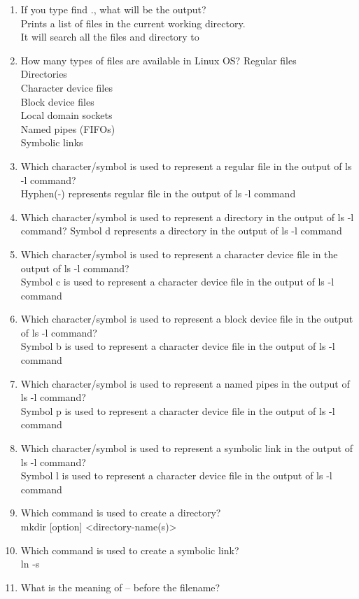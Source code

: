 \documentclass[12pt,a4]{article}
\begin{document}
\begin{enumerate}
\item  If you type find ., what will be the output?\\
Prints a list of files in the current working directory.
\\ It will search all the files and directory to
\item  How many types of files are available in Linux OS?
	Regular files\\
Directories\\
Character device files\\
Block device files\\
Local domain sockets\\
Named pipes (FIFOs)\\
Symbolic links
\item  Which character/symbol is used to represent a regular file in the output of ls -l
command?\\
Hyphen(-) represents regular file in the output of ls -l
command
\item Which character/symbol is used to represent a directory in the output of ls -l command?
Symbol d represents a directory in the output of ls -l command
\item  Which character/symbol is used to represent a character device file in the output of
ls -l command?\\
Symbol c is  used to represent a character device file in the output of
ls -l command
\item  Which character/symbol is used to represent a block device file in the output of
ls -l command?\\
Symbol b is  used to represent a character device file in the output of
ls -l command
\item  Which character/symbol is used to represent a named pipes in the output of ls -l
command?\\
Symbol p is  used to represent a character device file in the output of
ls -l command
\item Which character/symbol is used to represent a symbolic link in the output of ls -l
command?\\
Symbol l is  used to represent a character device file in the output of
ls -l command
\item  Which command is used to create a directory?\\
mkdir [option] <directory-name(s)>
\item  Which command is used to create a symbolic link?\\
ln -s
\item What is the meaning of -- before the filename?\\

\end{enumerate}
\end{document}
